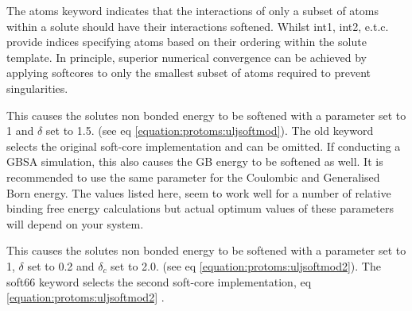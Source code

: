 \documentclass[letterpaper,10pt,english]{sphinxmanual}
\begin{document}
%
\begin{sphinxVerbatim}[commandchars=\\\{\}]
      
\end{sphinxVerbatim}

The atoms keyword indicates that the interactions of only a subset of atoms within a solute should have their interactions softened. Whilst int1, int2, e.t.c. provide indices specifying atoms based on their ordering within the solute template. In principle, superior numerical convergence can be achieved by applying softcores to only the smallest subset of atoms required to prevent singularities.

\ignorespaces 
\def\sphinxLiteralBlockLabel{\label{\detokenize{protoms:index-54}}}
%
\begin{sphinxVerbatim}[commandchars=\\\{\}]
       
\end{sphinxVerbatim}

This causes the solutes non bonded energy to be softened with a parameter  set to 1 and \(\delta\) set to 1.5. (see eq \eqref{equation:protoms:uljsoftmod}). The old keyword selects the original soft-core implementation and can be omitted. If conducting a GBSA simulation, this also causes the GB energy to be softened as well. It is recommended to use the same parameter for the Coulombic and Generalised Born energy. The values listed here, seem to work well for a number of relative binding free energy calculations but actual optimum values of these parameters will depend on your system.

%
\begin{sphinxVerbatim}[commandchars=\\\{\}]
       
\end{sphinxVerbatim}

This causes the solutes non bonded energy to be softened with a parameter  set to 1, \(\delta\) set to 0.2 and \(\delta_c\) set to 2.0. (see eq \eqref{equation:protoms:uljsoftmod2}). The soft66 keyword selects the second soft-core implementation, eq \eqref{equation:protoms:uljsoftmod2} .
\end{document}

